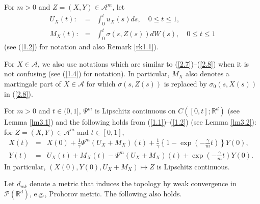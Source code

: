\documentclass[12pt]{article}
\begin{document}
For $m>0$ and $Z=(X,Y)\in \mathcal{A}^m$, let
\begin{eqnarray}
U_X(t):&=&\int_0^t u_X(s)ds,\quad 0\le t\le1,\label{2.7}\\
M_{X}(t):&=&\int_0^t\sigma(s,Z(s))dW(s),\quad 0\le t\le1\label{2.8}
\end{eqnarray}
 (see (\ref{1.2}) for notation and also Remark \ref{rk1.1}).

For $X\in \mathcal{A}$, we also use notations which are similar to (\ref{2.7})--(\ref{2.8}) when it is not confusing (see (\ref{1.4}) for notation).
In particular, $M_{X}$ also denotes a martingale part of $X\in \mathcal{A}$ for which $\sigma(s,Z(s))$ is replaced by $\sigma_0(s,X(s))$ in (\ref{2.8}).

For $m>0$ and $t\in (0,1]$, $\Psi^{m} $ is Lipschitz continuous on $C([0,t];\mathbb{R}^d)$ (see Lemma \ref{lm3.1}) and the  following holds from (\ref{1.1})--(\ref{1.2}) (see Lemma \ref{lm3.2}): for 
 $Z=(X,Y)\in \mathcal{A}^m$ and $t\in [0,1]$,
\begin{eqnarray}%
X(t)&=&X(0)+\frac{1}{\gamma}\Psi^{m} (U_X+M_X)(t)
+\frac{1}{\gamma}\left\{1-\exp \left(-\frac{\gamma}{m}t\right)\right\}Y(0), \quad \\
Y(t)&=&U_X(t)+M_X(t)-\Psi^{m} (U_X+M_X)(t)+\exp \left(-\frac{\gamma}{m}t\right)Y(0).
\end{eqnarray}
In particular, $(X(0), Y(0), U_X+M_X)\mapsto Z$  is Lipschitz continuous.

Let $d_{wk}$ denote a metric that induces the topology by weak convergence in $\mathcal{P}(\mathbb{R}^d)$, e.g., Prohorov metric.
The following also holds.
\end{document}
